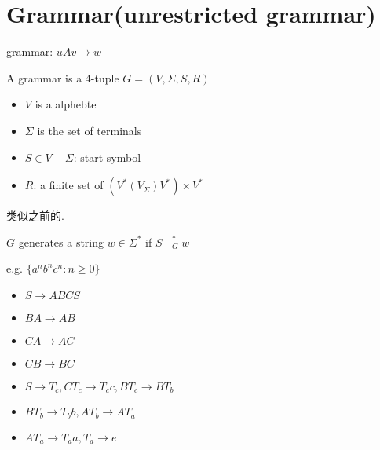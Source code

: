\newpage
\section{Grammar(unrestricted grammar)}
grammar: $uAv\to w$

\begin{definition}
    A grammar is a 4-tuple $G=(V,\Sigma, S, R)$
    \begin{itemize}
        \item $V$ is a alphebte
        \item $\Sigma$ is the set of terminals
        \item $S\in V-\Sigma$: start symbol
        \item $R$: a finite set of $(V^*(V_\Sigma)V^*)\times V^*$
    \end{itemize}
\end{definition}

\begin{definition}
    类似之前的.

    $G$ generates a string $w\in \Sigma^*$ if $S\vdash_G^*w$
\end{definition}

e.g. $\{ a^nb^nc^n:n\ge 0 \}$
\begin{itemize}
    \item $S\to ABCS$
    \item $BA\to AB$
    \item $CA\to AC$
    \item $CB\to BC$
    \item $S\to T_c, CT_c\to T_c c, BT_c\to BT_b$
    \item $BT_b\to T_bb, AT_b\to A T_a$
    \item $AT_a\to T_a a, T_a \to e$
\end{itemize}

